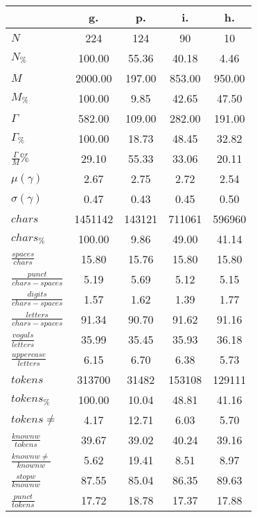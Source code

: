 \begin{table}[h!]
\begin{center}
\begin{tabular}{| l || c | c | c | c |}\hline
 & {\bf g.} & {\bf p.} & {\bf i.} & {\bf h.} \\\hline\hline
$N$ & 224  & 124  & 90  & 10 \\
$N_{\%}$ & 100.00  & 55.36  & 40.18  & 4.46 \\\hline
$M$ & 2000.00  & 197.00  & 853.00  & 950.00 \\
$M_{\%}$ & 100.00  & 9.85  & 42.65  & 47.50 \\\hline
$\Gamma$ & 582.00  & 109.00  & 282.00  & 191.00 \\
$\Gamma_{\%}$ & 100.00  & 18.73  & 48.45  & 32.82 \\\hline
$\frac{\Gamma}{M}\%$ & 29.10  & 55.33  & 33.06  & 20.11 \\
$\mu(\gamma)$ & 2.67  & 2.75  & 2.72  & 2.54 \\
$\sigma(\gamma)$ & 0.47  & 0.43  & 0.45  & 0.50 \\\hline\hline
$chars$ & 1451142  & 143121  & 711061  & 596960 \\
$chars_{\%}$ & 100.00  & 9.86  & 49.00  & 41.14 \\\hline
$\frac{spaces}{chars}$ & 15.80  & 15.76  & 15.80  & 15.80 \\
$\frac{punct}{chars-spaces}$ & 5.19  & 5.69  & 5.12  & 5.15 \\
$\frac{digits}{chars-spaces}$ & 1.57  & 1.62  & 1.39  & 1.77 \\\hline
$\frac{letters}{chars-spaces}$ & 91.34  & 90.70  & 91.62  & 91.16 \\
$\frac{vogals}{letters}$ & 35.99  & 35.45  & 35.93  & 36.18 \\
$\frac{uppercase}{letters}$ & 6.15  & 6.70  & 6.38  & 5.73 \\\hline\hline
$tokens$ & 313700  & 31482  & 153108  & 129111 \\
$tokens_{\%}$ & 100.00  & 10.04  & 48.81  & 41.16 \\
$tokens \neq$ & 4.17  & 12.71  & 6.03  & 5.70 \\\hline
$\frac{knownw}{tokens}$ & 39.67  & 39.02  & 40.24  & 39.16 \\
$\frac{knownw \neq}{knownw}$ & 5.62  & 19.41  & 8.51  & 8.97 \\\hline
$\frac{stopw}{knownw}$ & 87.55  & 85.04  & 86.35  & 89.63 \\
$\frac{punct}{tokens}$ & 17.72  & 18.78  & 17.37  & 17.88 \\

\end{tabular}
\end{center}
\end{table}

